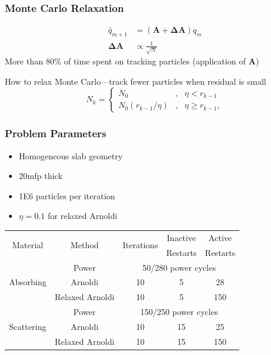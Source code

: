 \documentclass[color={usenames, dvipsnames},ignorenonframetext]{beamer}
\newcommand{\A}{\mathbf{A}}
\newcommand{\DA}{\mathbf{\Delta A}}
\begin{document}
\begin{frame}
    \frametitle{Monte Carlo Relaxation}
    \begin{align*}
        \hat{q}_{m+1} &= \left(\A + \DA\right)q_m \\
        \DA &\propto \frac{1}{\sqrt{N}}
    \end{align*}
    More than 80\% of time spent on tracking particles (application of $\A$)

    \pause
    \vspace{2ex}
    How to relax Monte Carlo\pause---track fewer particles when residual is small
    \begin{equation*}
        N_k = \left \{ 
            \begin{array}{ccc}
                N_0 &, & \eta < r_{k-1} \\
                N_0 \left( r_{k-1}/\eta \right) &, & \eta \geq r_{k-1},
            \end{array}
            \right.
    \end{equation*}
\end{frame}

\begin{frame}
    \frametitle{Problem Parameters}
    \begin{itemize}
        \item Homogeneous slab geometry
        \item 20mfp thick
        \item 1E6 particles per iteration
        \item $\eta = 0.1$ for relaxed Arnoldi
    \end{itemize}

    \begin{table}[h]
        \centering
        \begin{tabular}{ccccc}
            \toprule
            \multirow{2}{10ex}{Material} & \multirow{2}{10ex}{Method} & \multirow{2}{10ex}{Iterations} & Inactive & Active \\
            & & & Restarts & Restarts \\
            \midrule
            \multirow{3}{10ex}{Absorbing} & Power & \multicolumn{3}{c}{50/280 power cycles} \\
            & Arnoldi & 10 & 5 & 28 \\
            & Relaxed Arnoldi & 10 & 5 & 150 \\
            \midrule
            \multirow{3}{10ex}{Scattering} & Power & \multicolumn{3}{c}{150/250 power cycles} \\
            & Arnoldi & 10 & 15 & 25\\
            & Relaxed Arnoldi & 10 & 15 & 150\\
            \bottomrule
        \end{tabular}
    \end{table}
\end{frame}
\end{document}
